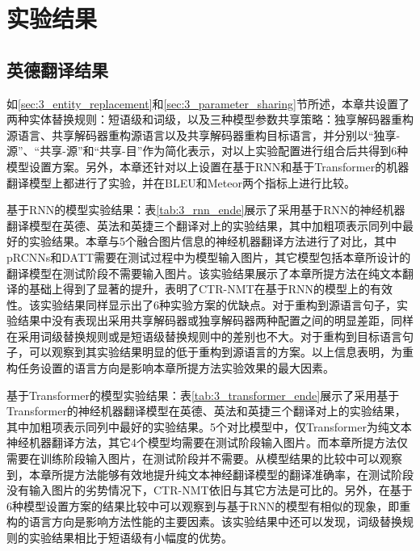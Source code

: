 \section{实验结果}

\subsection{英德翻译结果}
% 


如\ref{sec:3_entity_replacement}和\ref{sec:3_parameter_sharing}节所述，本章共设置了两种实体替换规则：短语级和词级，以及三种模型参数共享策略：独享解码器重构源语言、共享解码器重构源语言以及共享解码器重构目标语言，并分别以“独享-源”、“共享-源”和“共享-目”作为简化表示，对以上实验配置进行组合后共得到6种模型设置方案。另外，本章还针对以上设置在基于RNN和基于Transformer的机器翻译模型上都进行了实验，并在BLEU和Meteor两个指标上进行比较。

{\sffamily 基于RNN的模型实验结果：}表\ref{tab:3_rnn_ende}展示了采用基于RNN的神经机器翻译模型在英德、英法和英捷三个翻译对上的实验结果，其中加粗项表示同列中最好的实验结果。本章与5个融合图片信息的神经机器翻译方法进行了对比，其中pRCNNs和DATT需要在测试过程中为模型输入图片，其它模型包括本章所设计的翻译模型在测试阶段不需要输入图片。该实验结果展示了本章所提方法在纯文本翻译的基础上得到了显著的提升，表明了CTR-NMT在基于RNN的模型上的有效性。该实验结果同样显示出了6种实验方案的优缺点。对于重构到源语言句子，实验结果中没有表现出采用共享解码器或独享解码器两种配置之间的明显差距，同样在采用词级替换规则或是短语级替换规则中的差别也不大。对于重构到目标语言句子，可以观察到其实验结果明显的低于重构到源语言的方案。以上信息表明，为重构任务设置的语言方向是影响本章所提方法实验效果的最大因素。

% 
{\sffamily 基于Transformer的模型实验结果：}表\ref{tab:3_transformer_ende}展示了采用基于Transformer的神经机器翻译模型在英德、英法和英捷三个翻译对上的实验结果，其中加粗项表示同列中最好的实验结果。5个对比模型中，仅Transformer为纯文本神经机器翻译方法，其它4个模型均需要在测试阶段输入图片。而本章所提方法仅需要在训练阶段输入图片，在测试阶段并不需要。从模型结果的比较中可以观察到，本章所提方法能够有效地提升纯文本神经翻译模型的翻译准确率，在测试阶段没有输入图片的劣势情况下，CTR-NMT依旧与其它方法是可比的。另外，在基于6种模型设置方案的结果比较中可以观察到与基于RNN的模型有相似的现象，即重构的语言方向是影响方法性能的主要因素。该实验结果中还可以发现，词级替换规则的实验结果相比于短语级有小幅度的优势。

